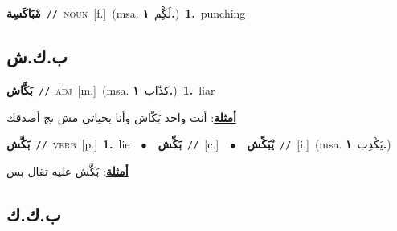 \documentclass[10pt,a4paper,twoside]{article} %
\begin{document}
\begin{multicols}{2}
{\setlength\topsep{0pt}\textbf{\foreignlanguage{arabic}{مْبَاكَسِة}}\ {\color{gray}\texttt{//}\color{black}}\ \textsc{noun}\ [f.]\ \color{gray}(msa. \foreignlanguage{arabic}{لَكِْم}~\foreignlanguage{arabic}{\textbf{١.}})\color{black}\ \textbf{1.}~punching\ } \vspace{2mm}

\vspace{-3mm}
\subsection*{\color{blue}\foreignlanguage{arabic}{ب.ك.ش}\color{blue}{}} 

{\setlength\topsep{0pt}\textbf{\foreignlanguage{arabic}{بَكَّاش}}\ {\color{gray}\texttt{//}\color{black}}\ \textsc{adj}\ [m.]\ \color{gray}(msa. \foreignlanguage{arabic}{كذّاب}~\foreignlanguage{arabic}{\textbf{١.}})\color{black}\ \textbf{1.}~liar\  \begin{flushright}\color{gray}\foreignlanguage{arabic}{\textbf{\underline{\foreignlanguage{arabic}{أمثلة}}}: أنت واحد بَكّاش وأنا بحياتي مش ىج أصدقك}\end{flushright}\color{black}} \vspace{2mm}

{\setlength\topsep{0pt}\textbf{\foreignlanguage{arabic}{بَكَّش}}\ {\color{gray}\texttt{//}\color{black}}\ \textsc{verb}\ [p.]\ \textbf{1.}~lie\ \ $\bullet$\ \ \setlength\topsep{0pt}\textbf{\foreignlanguage{arabic}{بَكِّش}}\ {\color{gray}\texttt{//}\color{black}}\ [c.]\ \ $\bullet$\ \ \setlength\topsep{0pt}\textbf{\foreignlanguage{arabic}{يْبَكِّش}}\ {\color{gray}\texttt{//}\color{black}}\ [i.]\ \color{gray}(msa. \foreignlanguage{arabic}{يَكْذِب}~\foreignlanguage{arabic}{\textbf{١.}})\color{black}\  \begin{flushright}\color{gray}\foreignlanguage{arabic}{\textbf{\underline{\foreignlanguage{arabic}{أمثلة}}}: بَكَّش عليه تقال بس}\end{flushright}\color{black}} \vspace{2mm}

\vspace{-3mm}
\subsection*{\color{blue}\foreignlanguage{arabic}{ب.ك.ك}\color{blue}{}} 


\end{multicols}
\end{document}

